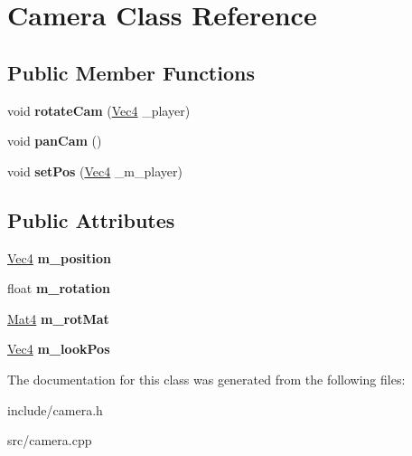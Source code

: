 \hypertarget{classCamera}{
\section{Camera Class Reference}
\label{classCamera}
}
\subsection*{Public Member Functions}
\begin{DoxyCompactItemize}
\item 
\hypertarget{classCamera_a35043d4218297fc6e645f4637225a76c}{
void {\bfseries rotateCam} (\hyperlink{classVec4}{Vec4} \_\-player)}
\label{classCamera_a35043d4218297fc6e645f4637225a76c}

\item 
\hypertarget{classCamera_a730558b72058c25e81ad13b1eb0b0f2f}{
void {\bfseries panCam} ()}
\label{classCamera_a730558b72058c25e81ad13b1eb0b0f2f}

\item 
\hypertarget{classCamera_aacf0b299594d7f25b7373223c4c87553}{
void {\bfseries setPos} (\hyperlink{classVec4}{Vec4} \_\-m\_\-player)}
\label{classCamera_aacf0b299594d7f25b7373223c4c87553}

\end{DoxyCompactItemize}
\subsection*{Public Attributes}
\begin{DoxyCompactItemize}
\item 
\hypertarget{classCamera_a1e03b65deee529566e7552ca8a7c43de}{
\hyperlink{classVec4}{Vec4} {\bfseries m\_\-position}}
\label{classCamera_a1e03b65deee529566e7552ca8a7c43de}

\item 
\hypertarget{classCamera_a17e3ec1527c5b06371e19320a8dec03d}{
float {\bfseries m\_\-rotation}}
\label{classCamera_a17e3ec1527c5b06371e19320a8dec03d}

\item 
\hypertarget{classCamera_a5e06c87ccde223eab1f30808b156dc1a}{
\hyperlink{classMat4}{Mat4} {\bfseries m\_\-rotMat}}
\label{classCamera_a5e06c87ccde223eab1f30808b156dc1a}

\item 
\hypertarget{classCamera_af5d4958a06fe1ee70c4afb726985f2f1}{
\hyperlink{classVec4}{Vec4} {\bfseries m\_\-lookPos}}
\label{classCamera_af5d4958a06fe1ee70c4afb726985f2f1}

\end{DoxyCompactItemize}


The documentation for this class was generated from the following files:\begin{DoxyCompactItemize}
\item 
include/camera.h\item 
src/camera.cpp\end{DoxyCompactItemize}
